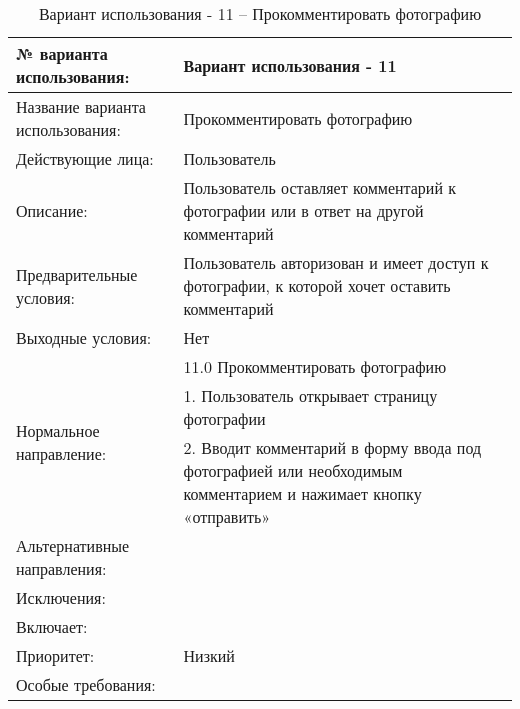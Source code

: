 \begin{table}[H]
  \caption{Вариант использования - 11 – Прокомментировать фотографию}\label{use-case-11-table}
  \begin{tabular}{|p{6cm}|p{10cm}|}
  \hline № варианта использования: & Вариант использования - 11 \\
  \hline Название варианта использования: & Прокомментировать фотографию \\
  \hline Действующие лица: & Пользователь \\
  \hline Описание: & Пользователь оставляет комментарий к фотографии или в ответ на другой комментарий \\
  \hline Предварительные условия: & Пользователь авторизован и имеет доступ к фотографии, к которой хочет оставить комментарий \\
  \hline Выходные условия: & Нет \\
  \hline \multirow{3}{*}{Нормальное направление:} & 11.0 Прокомментировать фотографию \\
  \cline{2-2} & 1. Пользователь открывает страницу фотографии \\
  \cline{2-2} & 2. Вводит комментарий в форму ввода под фотографией или необходимым комментарием и нажимает кнопку «отправить» \\
  \hline Альтернативные направления: &  \\
  \hline Исключения: &  \\
  \hline Включает: &  \\
  \hline Приоритет: & Низкий \\
  \hline Особые требования: &  \\
  \hline 
  \end{tabular}
\end{table}

